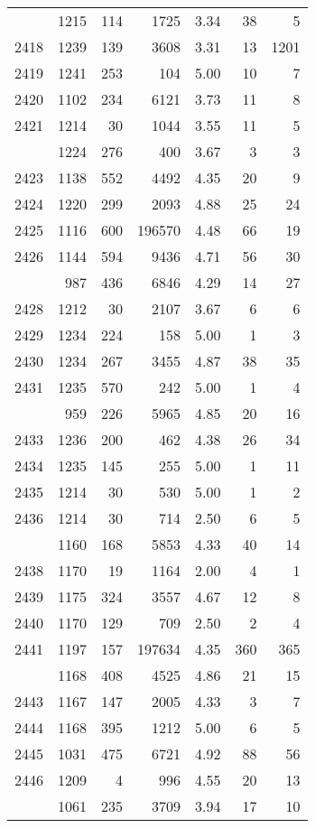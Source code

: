 \documentclass[
]{article}
\begin{document}
\begin{table}
\begin{tabular}[t]{lrrrrrr}
\addlinespace
2417 & 1215 & 114 & 1725 & 3.34 & 38 & 5\\
2418 & 1239 & 139 & 3608 & 3.31 & 13 & 1201\\
2419 & 1241 & 253 & 104 & 5.00 & 10 & 7\\
2420 & 1102 & 234 & 6121 & 3.73 & 11 & 8\\
2421 & 1214 & 30 & 1044 & 3.55 & 11 & 5\\
\addlinespace
2422 & 1224 & 276 & 400 & 3.67 & 3 & 3\\
2423 & 1138 & 552 & 4492 & 4.35 & 20 & 9\\
2424 & 1220 & 299 & 2093 & 4.88 & 25 & 24\\
2425 & 1116 & 600 & 196570 & 4.48 & 66 & 19\\
2426 & 1144 & 594 & 9436 & 4.71 & 56 & 30\\
\addlinespace
2427 & 987 & 436 & 6846 & 4.29 & 14 & 27\\
2428 & 1212 & 30 & 2107 & 3.67 & 6 & 6\\
2429 & 1234 & 224 & 158 & 5.00 & 1 & 3\\
2430 & 1234 & 267 & 3455 & 4.87 & 38 & 35\\
2431 & 1235 & 570 & 242 & 5.00 & 1 & 4\\
\addlinespace
2432 & 959 & 226 & 5965 & 4.85 & 20 & 16\\
2433 & 1236 & 200 & 462 & 4.38 & 26 & 34\\
2434 & 1235 & 145 & 255 & 5.00 & 1 & 11\\
2435 & 1214 & 30 & 530 & 5.00 & 1 & 2\\
2436 & 1214 & 30 & 714 & 2.50 & 6 & 5\\
\addlinespace
2437 & 1160 & 168 & 5853 & 4.33 & 40 & 14\\
2438 & 1170 & 19 & 1164 & 2.00 & 4 & 1\\
2439 & 1175 & 324 & 3557 & 4.67 & 12 & 8\\
2440 & 1170 & 129 & 709 & 2.50 & 2 & 4\\
2441 & 1197 & 157 & 197634 & 4.35 & 360 & 365\\
\addlinespace
2442 & 1168 & 408 & 4525 & 4.86 & 21 & 15\\
2443 & 1167 & 147 & 2005 & 4.33 & 3 & 7\\
2444 & 1168 & 395 & 1212 & 5.00 & 6 & 5\\
2445 & 1031 & 475 & 6721 & 4.92 & 88 & 56\\
2446 & 1209 & 4 & 996 & 4.55 & 20 & 13\\
\addlinespace
2447 & 1061 & 235 & 3709 & 3.94 & 17 & 10\\

\end{tabular}
\end{table}
\end{document}
